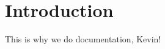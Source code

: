 \hypertarget{index_intro_sec}{}\section{Introduction}\label{index_intro_sec}
This is why we do documentation, Kevin! 